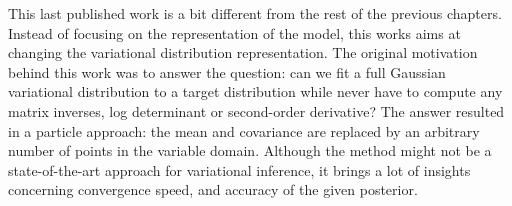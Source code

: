 


\graphicspath{{7/figures/}}
This last published work is a bit different from the rest of the previous chapters.
Instead of focusing on the representation of the model, this works aims at changing the variational distribution representation.
The original motivation behind this work was to answer the question: can we fit a full Gaussian variational distribution to a target distribution while never have to compute any matrix inverses, log determinant or second-order derivative?
The answer resulted in a particle approach: the mean and covariance are replaced by an arbitrary number of points in the variable domain.
Although the method might not be a state-of-the-art approach for variational inference, it brings a lot of insights concerning convergence speed, and accuracy of the given posterior.

